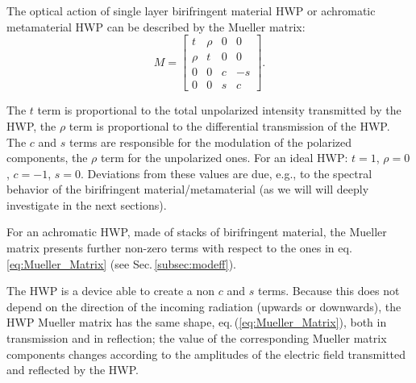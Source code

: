 The optical action of single layer birifringent material HWP or achromatic metamaterial HWP can be described by the Mueller matrix:
\begin{equation}
M=\begin{bmatrix}
   t  &\rho  &0  &0\\
   \rho  &t  &0  &0\\
   0  &0  &c  &-s\\
   0  &0  &s  &c
\end{bmatrix}.
\label{eq:Mueller_Matrix}
\end{equation}

The $t$ term is proportional to the total unpolarized intensity transmitted by the HWP, the $\rho$ term is proportional to the differential transmission of the HWP. The $c$ and $s$ terms are responsible for the modulation of the polarized components, the $\rho$ term for the unpolarized ones. For an ideal HWP: $t=1$, $\rho=0$, $c=-1$, $s=0$. Deviations from these values are due, e.g., to the spectral behavior of the birifringent material/metamaterial (as we will will deeply investigate in the next sections).

For an achromatic HWP, made of stacks of birifringent material, the Mueller matrix presents further non-zero terms with respect to the ones in eq.\,\ref{eq:Mueller_Matrix} (see Sec.\,\ref{subsec:modeff}). 

The HWP is a device able to create a non $c$ and $s$ terms. Because this does not depend on the direction of the incoming radiation (upwards or downwards), the HWP Mueller matrix has the same shape, eq.\,(\ref{eq:Mueller_Matrix}), both in transmission and in reflection; the value of the corresponding Mueller matrix components changes according to the amplitudes of the electric field transmitted and reflected by the HWP.








